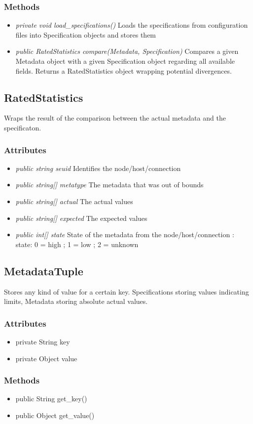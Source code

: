 \subsubsection{Methods}
\begin{itemize}
	\item \textit{private void load\_specifications()}
	Loads the specifications from configuration files into Specification objects and stores them
	\item \textit{public RatedStatistics compare(Metadata, Specification)}
	Compares a given Metadata object with a given Specification object regarding all available fields. Returns a RatedStatistics object wrapping potential divergences.
\end{itemize}


\subsection{RatedStatistics}
Wraps the result of the comparison between the actual metadata and the specificaton.

\subsubsection{Attributes}
\begin{itemize}
	\item \textit{public string seuid}
	Identifies the node/host/connection
	\item \textit{public string[] metatype}
	The metadata that was out of bounds
	\item \textit{public string[] actual}
	The actual values
	\item \textit{public string[] expected}
	The expected values
	\item \textit{public int[] state}
	State of the metadata from the node/host/connection : state: { 0 = high ; 1 = low ; 2 = unknown}
\end{itemize}


\subsection{MetadataTuple}
Stores any kind of value for a certain key. Specifications storing values indicating limits, Metadata storing absolute actual values.

\subsubsection{Attributes}
\begin{itemize}
	\item private String key
	\item private Object value
\end{itemize}
\subsubsection{Methods}
\begin{itemize}
	\item public String get\_key()
	\item public Object get\_value()
\end{itemize}
